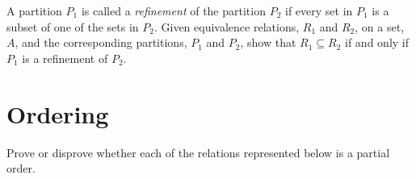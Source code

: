 \documentclass[addpoints]{exam}
\begin{document}
\begin{questions}
\begin{multicols}{2}
  \end{multicols}
  \begin{solution}
    \begin{parts}
    \part 
    \part 
    \end{parts}
  \end{solution}

\question[5] A partition $P_1$ is called a \textit{refinement} of the partition $P_2$ if every set in $P_1$ is a subset of one of the sets in $P_2$. Given equivalence relations, $R_1$ and $R_2$, on a set, $A$, and the corresponding partitions, $P_1$ and $P_2$, show that $R_1 \subseteq R_2$ if and only if $P_1$ is a refinement of $P_2$.
  \begin{solution}
  \end{solution}

  \section{Ordering}
  
\question Prove or disprove whether each of the relations represented below is a partial order.
  \begin{multicols}{3}
  \end{multicols}
  \begin{solution}
    \begin{parts}

\end{parts}
\end{solution}
\end{questions}
\end{document}
